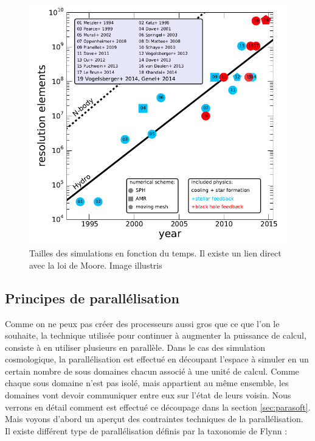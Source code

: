 \begin{figure}[bth]
        \includegraphics[width=.95\linewidth]{img/02/figure_simulations_with_time.png} 
        \caption[Évolution de la taille des simulations]{Tailles des simulations en fonction du temps.
        Il existe un lien direct avec la loi de Moore.
        Image illustris}
 		\label{fig:taillesimu}
\end{figure}


\subsection{Principes de parallélisation}

Comme on ne peux pas créer des processeurs aussi gros que ce que l'on le souhaite, la technique utilisée pour continuer à augmenter la puissance de calcul, consiste à en utiliser plusieurs en parallèle.
Dans le cas des simulation cosmologique, la parallélisation est effectué en découpant l'espace à simuler en un certain nombre de sous domaines chacun associé à une unité de calcul.
Comme chaque sous domaine n'est pas isolé, mais appartient au même ensemble, les domaines vont devoir communiquer entre eux sur l'état de leurs voisin.
Nous verrons en détail comment est effectué ce découpage dans la section \ref{sec:parasoft}.
Mais voyons d'abord un aperçut des contraintes techniques de la parallélisation.
Il existe différent type de parallélisation définis par la taxonomie de Flynn \citep{Flynn:1972:COE:1952456.1952459}: 

